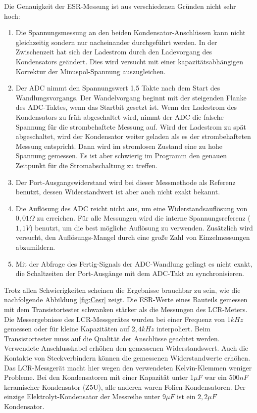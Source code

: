 Die Genauigkeit der ESR-Messung ist aus verschiedenen Gründen nicht sehr hoch:
\begin{enumerate}
\item Die Spannungsmessung an den beiden Kondensator-Anschlüssen kann nicht gleichzeitig sondern nur nacheinander durchgeführt werden.
 In der Zwischenzeit hat sich der Ladestrom durch den Ladevorgang des Kondensators geändert.
Dies wird versucht mit einer kapazitätsabhängigen Korrektur der Minuspol-Spannung auszugleichen.
\item Der ADC nimmt den Spannungswert 1,5 Takte nach dem Start des Wandlungsvorgangs. Der Wandelvorgang beginnt mit
der steigenden Flanke des ADC-Taktes, wenn das Startbit gesetzt ist. Wenn der Ladestrom des Kondensators zu früh abgeschaltet wird,
nimmt der ADC die falsche Spannung für die strombehaftete Messung auf. Wird der Ladestrom zu spät abgeschaltet, wird
der Kondensator weiter geladen als es der strombehafteten Messung entspricht.
Dann wird im stromlosen Zustand eine zu hohe Spannung gemessen.
Es ist aber schwierig im Programm den genauen Zeitpunkt für die Stromabschaltung zu treffen.
\item Der Port-Ausgangswiderstand wird bei dieser Messmethode als Referenz benutzt, dessen Widerstandwert
ist aber auch nicht exakt bekannt.
\item Die Auflösung des ADC reicht nicht aus, um eine Widerstandsauflösung von \(0,01\Omega\) zu erreichen.
Für alle Messungen wird die interne Spannungsreferenz (\(1,1V\)) benutzt, um die best mögliche Auflösung zu verwenden.
Zusätzlich wird versucht, den Auflösungs-Mangel durch eine große Zahl von Einzelmessungen abzumildern.
\item Mit der Abfrage des Fertig-Signals der ADC-Wandlung gelingt es nicht exakt, die Schaltzeiten der Port-Ausgänge mit dem
ADC-Takt zu synchronisieren.
\end{enumerate}

Trotz allen Schwierigkeiten scheinen die Ergebnisse brauchbar zu sein, wie die nachfolgende Abbildung \ref{fig:Cesr} zeigt.
Die ESR-Werte eines Bauteils gemessen mit dem Transistortester schwanken stärker als die Messungen des LCR-Meters.
Die Messergebnisse des LCR-Messgerätes wurden bei einer Frequenz von \(1kHz\) gemessen oder für kleine Kapazitäten auf
\(2,4kHz\) interpoliert.
Beim Transistortester muss auf die Qualität der Anschlüsse geachtet werden. Verwendete Anschlusskabel
erhöhen den gemessenen Widerstandswert. Auch die Kontakte von Steckverbindern können die gemessenen
Widerstandwerte erhöhen. Das LCR-Messgerät macht hier wegen den verwendeten Kelvin-Klemmen weniger Probleme.
Bei den Kondensatoren mit einer Kapazität unter \(1\mu F\) war ein \(500nF\) keramischer 
Kondensator (Z5U), alle anderen waren Folien-Kondensatoren. Der einzige Elektrolyt-Kondensator der Messreihe unter \(9\mu F\)  
ist ein \(2,2\mu F\) Kondensator.

